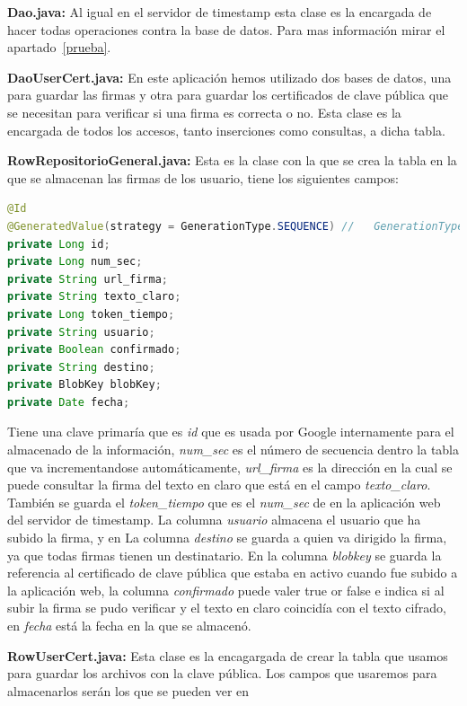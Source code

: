 \begin{description}
\item \textbf{Dao.java:} Al igual en el servidor de timestamp esta clase es la encargada de hacer todas operaciones contra la base de datos. Para mas información mirar el apartado~\ref{prueba}.

\item \textbf{DaoUserCert.java:} En este aplicación hemos utilizado dos bases de datos, una para guardar las firmas y otra para guardar los certificados de clave pública que se necesitan para verificar si una firma es correcta o no. Esta clase es la encargada de todos los accesos, tanto inserciones como consultas, a dicha tabla. 

\item \textbf{RowRepositorioGeneral.java:} Esta es la clase con la que se crea la tabla en la que se almacenan las firmas de los usuario, tiene los siguientes campos:  

\begin{lstlisting}[language=Java]
@Id
@GeneratedValue(strategy = GenerationType.SEQUENCE) //	 GenerationType.IDENTITY
private Long id;
private Long num_sec;
private String url_firma;
private String texto_claro;
private Long token_tiempo;
private String usuario;
private Boolean confirmado;
private String destino;
private BlobKey blobKey;
private Date fecha;
\end{lstlisting}

Tiene una clave primaría que es \textit{id} que es usada por Google internamente para el almacenado de la información, \textit{num\_sec} es el número de secuencia dentro la tabla que va incrementandose automáticamente, \textit{url\_firma} es la dirección en la cual se puede consultar la firma del texto en claro que está en el campo \textit{texto\_claro}. También se guarda el \textit{token\_tiempo} que es el \textit{num\_sec} de en la aplicación web del servidor de timestamp. La columna \textit{usuario} almacena el usuario que ha subido la firma, y en La columna \textit{destino} se guarda a quien va dirigido la firma, ya que todas firmas tienen un destinatario. En la columna \textit{blobkey} se guarda la referencia al certificado de clave pública que estaba en activo cuando fue subido a la aplicación web, la columna \textit{confirmado} puede valer true or false e indica si al subir la firma se pudo verificar y el texto en claro coincidía con el texto cifrado, en \textit{fecha} está la fecha en la que se almacenó.

\item \textbf{RowUserCert.java:} Esta clase es la encagargada de crear la tabla que usamos para guardar los archivos con la clave pública.
Los campos que usaremos para almacenarlos serán los que se pueden ver en 


\end{description}
